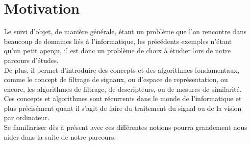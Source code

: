 \section{Motivation}
Le suivi d'objet, de manière générale, étant un problème que l'on rencontre dans beaucoup de domaines liés à l'informatique, les précédents exemples n'étant qu'un petit aperçu, il est donc un problème de choix à étudier lors de notre parcours d'études.\\
De plus, il permet d'introduire des concepts et des algorithmes fondamentaux, comme le concept de filtrage de signaux, ou d'espace de représentation, ou encore, les algorithmes de filtrage, de descripteurs, ou de mesures de similarité.\\
Ces concepts et algorithmes sont récurrents dans le monde de l'informatique et plus précisément quant il s'agit de faire du traitement du signal ou de la vision par ordinateur.\\
Se familiariser dès à présent avec ces différentes notions pourra grandement nous aider dans la suite de notre parcours.\\




